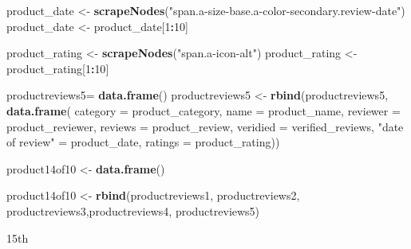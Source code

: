 \documentclass[
]{article}
\newenvironment{Shaded}{\begin{snugshade}}{\end{snugshade}}
\newcommand{\AttributeTok}[1]{\textcolor[rgb]{0.13,0.29,0.53}{#1}}
\newcommand{\DecValTok}[1]{\textcolor[rgb]{0.00,0.00,0.81}{#1}}
\newcommand{\FunctionTok}[1]{\textcolor[rgb]{0.13,0.29,0.53}{\textbf{#1}}}
\newcommand{\NormalTok}[1]{#1}
\newcommand{\OtherTok}[1]{\textcolor[rgb]{0.56,0.35,0.01}{#1}}
\newcommand{\SpecialCharTok}[1]{\textcolor[rgb]{0.81,0.36,0.00}{\textbf{#1}}}
\newcommand{\StringTok}[1]{\textcolor[rgb]{0.31,0.60,0.02}{#1}}
\begin{document}
\begin{Shaded}
\begin{Highlighting}[]
\NormalTok{  product\_date }\OtherTok{\textless{}{-}} \FunctionTok{scrapeNodes}\NormalTok{(}\StringTok{"span.a{-}size{-}base.a{-}color{-}secondary.review{-}date"}\NormalTok{)}
\NormalTok{  product\_date }\OtherTok{\textless{}{-}}\NormalTok{ product\_date[}\DecValTok{1}\SpecialCharTok{:}\DecValTok{10}\NormalTok{]}
  
\NormalTok{  product\_rating }\OtherTok{\textless{}{-}} \FunctionTok{scrapeNodes}\NormalTok{(}\StringTok{"span.a{-}icon{-}alt"}\NormalTok{)}
\NormalTok{  product\_rating }\OtherTok{\textless{}{-}}\NormalTok{ product\_rating[}\DecValTok{1}\SpecialCharTok{:}\DecValTok{10}\NormalTok{]}
  
\NormalTok{  productreviews5}\OtherTok{=} \FunctionTok{data.frame}\NormalTok{()}
\NormalTok{  productreviews5 }\OtherTok{\textless{}{-}} \FunctionTok{rbind}\NormalTok{(productreviews5, }\FunctionTok{data.frame}\NormalTok{(}
                      \AttributeTok{category =}\NormalTok{ product\_category,}
                      \AttributeTok{name =}\NormalTok{ product\_name,}
                      \AttributeTok{reviewer =}\NormalTok{ product\_reviewer,}
                      \AttributeTok{reviews =}\NormalTok{ product\_review,}
                      \AttributeTok{veridied =}\NormalTok{ verified\_reviews,}
                      \StringTok{"date of review"} \OtherTok{=}\NormalTok{ product\_date,}
                      \AttributeTok{ratings =}\NormalTok{ product\_rating))}
  
\NormalTok{  product14of10 }\OtherTok{\textless{}{-}} \FunctionTok{data.frame}\NormalTok{()}
  
\NormalTok{  product14of10 }\OtherTok{\textless{}{-}} \FunctionTok{rbind}\NormalTok{(productreviews1, productreviews2, productreviews3,productreviews4, productreviews5)}
\end{Highlighting}
\end{Shaded}

15th
\end{document}
